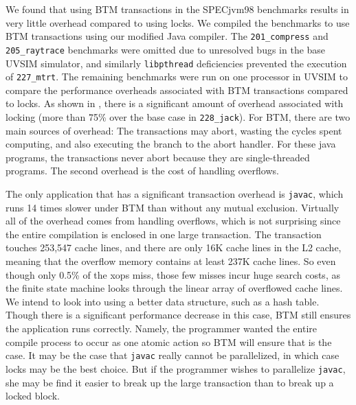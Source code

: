 \documentclass[preprint]{rdbacmconf}
\begin{document}
We found that using BTM transactions in the SPECjvm98 benchmarks
results in very little overhead compared to using locks. We compiled
the benchmarks to use BTM transactions using our modified Java
compiler.  The \texttt{201\_compress} and \texttt{205\_raytrace}
benchmarks were omitted due to unresolved bugs in the base UVSIM
simulator, and similarly \texttt{libpthread} deficiencies prevented
the execution of \texttt{227\_mtrt}.
The remaining benchmarks were run on one processor in UVSIM to compare the
performance overheads associated with BTM transactions compared to
locks.  As shown in , there is a significant amount
of overhead associated with locking (more than 75\% over the base case
in {\texttt{228\_jack})}. %
For BTM, there are two main sources of
overhead: The transactions may abort, wasting the cycles spent
computing, and also executing the branch to the abort handler.  For
these java programs, the transactions never abort because they are
single-threaded programs.  The second overhead is the cost of handling
overflows.

The only application that has a significant transaction overhead is
\texttt{javac}, which runs 14 times slower under BTM than without any
mutual exclusion.  Virtually all of the overhead comes from handling
overflows, which is not surprising since the entire compilation is
enclosed in one large transaction.  The transaction touches 253,547
cache lines, and there are only 16K cache lines in the L2 cache,
meaning that the overflow memory contains at least 237K cache lines.
So even though only 0.5\% of the xops miss, those few misses incur
huge search costs, as the finite state machine looks through the
linear array of overflowed cache lines.  We intend to look into using
a better data structure, such as a hash table.  Though there is a
significant performance decrease in this case, BTM still ensures the
application runs correctly. Namely, the programmer wanted the entire
compile process to occur as one atomic action so BTM will ensure that
is the case.  It may be the case that \texttt{javac} really cannot be
parallelized, in which case locks may be the best choice.  But if the
programmer wishes to parallelize \texttt{javac}, she may be find it
easier to break up the large transaction than to break up a locked
block.


\renewcommand{\baselinestretch}{1}


\end{document}
